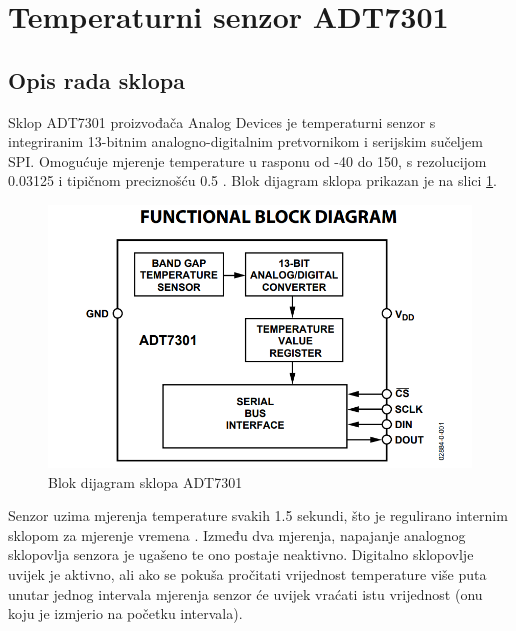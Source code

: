     \section{Temperaturni senzor ADT7301}

        \subsection{Opis rada sklopa}
            Sklop ADT7301 proizvođača Analog Devices je temperaturni senzor s integriranim 13-bitnim analogno-digitalnim pretvornikom i serijskim sučeljem SPI. Omogućuje mjerenje temperature u rasponu od -40\textcelsius{} do 150\textcelsius{}, s rezolucijom 0.03125\textcelsius{} i tipičnom preciznošću \textpm{} 0.5\textcelsius{} \cite{adt7301_datasheet}. Blok dijagram sklopa prikazan je na slici \ref{fig:adt7301_blok_dijagram}.
            
            \begin{figure}[htb]
                \centering
                \includegraphics{slike/ADT7301_blok_dijagram.png}
                \caption{Blok dijagram sklopa ADT7301 \cite{adt7301_datasheet}}
                \label{fig:adt7301_blok_dijagram}
            \end{figure}

            Senzor uzima mjerenja temperature svakih 1.5 sekundi, što je regulirano internim sklopom za mjerenje vremena . Između dva mjerenja, napajanje analognog sklopovlja senzora je ugašeno te ono postaje neaktivno. Digitalno sklopovlje uvijek je aktivno, ali ako se pokuša pročitati vrijednost temperature više puta unutar jednog intervala mjerenja senzor će uvijek vraćati istu vrijednost (onu koju je izmjerio na početku intervala).
            
